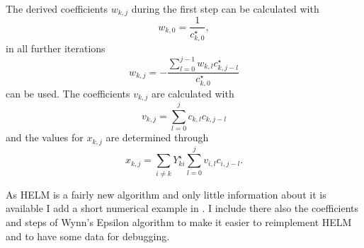 The derived coefficients $w_{k,j}$ during the first step can be calculated with
\begin{equation}
	w_{k,0} = \frac{1}{c_{k,0}^\star},
\end{equation}
in all further iterations
\begin{equation}
	w_{k,j} = - \frac{\sum_{l = 0}^{j - 1} w_{k,l} c_{k,j - l}^\star}{c_{k,0}^\star}
\end{equation}
can be used. The coefficients $v_{k,j}$ are calculated with
\begin{equation}
	v_{k,j} = \sum_{l = 0}^j c_{k,l} c_{k,j - l}
\end{equation}
and the values for $x_{k,j}$ are determined through
\begin{equation}
	x_{k,j} = \sum_{i \ne k} Y_{ki}^\star \sum_{l = 0}^j v_{i,l} c_{i,j - l}.
\end{equation}

As HELM is a fairly new algorithm and only little information about it is available I add a short numerical example in . I include there also the coefficients and steps of Wynn's Epsilon algorithm to make it easier to reimplement HELM and to have some data for debugging.